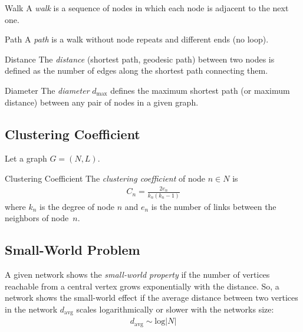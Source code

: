 \documentclass[english]{panikzettel}
\begin{document}
\begin{halfboxl}
	\vspace{-\baselineskip}
	\begin{defi}{Walk}
		A \emph{walk} is a sequence of nodes in which each node is adjacent to the next one.
	\end{defi}
\end{halfboxl}%
\begin{halfboxr}
	\vspace{-\baselineskip}
	\begin{defi}{Path}
		A \emph{path} is a walk without node repeats and different ends (no loop).
	\end{defi}
\end{halfboxr}

\begin{halfboxl}
	\vspace{-\baselineskip}
	\begin{defi}{Distance}
		The \emph{distance} (shortest path, geodesic path) between two nodes is defined as the number of edges along the shortest path connecting them.
	\end{defi}
\end{halfboxl}%
\begin{halfboxr}
	\vspace{-\baselineskip}
	\begin{defi}{Diameter}
		The \emph{diameter} $ d_\text{max} $ defines the maximum shortest path (or maximum distance) between any pair of nodes in a given graph.
	\end{defi}
\end{halfboxr}

\subsection{Clustering Coefficient} \label{sec:clustering_coefficient}
Let a graph $ G = (N,L) $.

\begin{defi}{Clustering Coefficient}
	The \textit{clustering coefficient} of node $ n \in N $ is
	\begin{align*}
		C_n = \frac{2 e_n}{k_n (k_n - 1)}
	\end{align*}
	where $ k_n $ is the degree of node $ n $ and $ e_n $ is the number of links between the neighbors of node~$ n $.
\end{defi}

\subsection{Small-World Problem}\label{sec:small_world_problem}
A given network shows the \textit{small-world property} if the number of vertices reachable from a central vertex grows exponentially with the distance.
So, a network shows the small-world effect if the average distance between two vertices in the network $ d_\text{avg} $ scales logarithmically or slower with the networks size:
\begin{align*}
	d_\text{avg} \sim \text{log} |N|
\end{align*}
\end{document}
